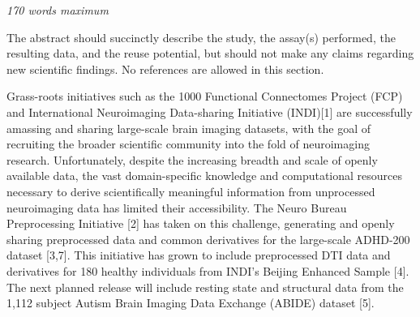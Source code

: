\textit{170 words maximum}

The abstract should succinctly describe the study, the assay(s) performed, the resulting data, and the reuse potential, but should not make any claims regarding new scientific findings.  No references are allowed in this section.

 Grass-roots initiatives such as the 1000 Functional Connectomes Project (FCP)
		    and International Neuroimaging Data-sharing Initiative (INDI)[1] are
successfully amassing and sharing large-scale brain imaging datasets, with the
goal of recruiting the broader scientific community into the fold of
neuroimaging research. Unfortunately, despite the increasing breadth and scale
of openly available data, the vast domain-specific knowledge and computational
resources necessary to derive scientifically meaningful information from
unprocessed neuroimaging data has limited their accessibility. The Neuro Bureau
Preprocessing Initiative [2] has taken on this challenge,
generating and openly sharing preprocessed data and common derivatives for the
large-scale ADHD-200 dataset [3,7]. This initiative has grown to
include preprocessed DTI data and derivatives for 180 healthy individuals from
INDI's Beijing Enhanced Sample [4]. The next planned release will
include resting state and structural data from the 1,112 subject Autism Brain
Imaging Data Exchange (ABIDE) dataset [5].


